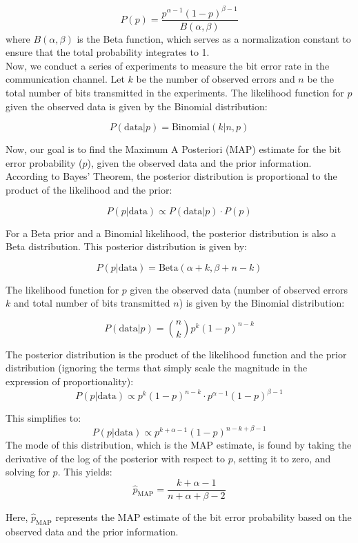 \documentclass[12pt]{book}
\theoremstyle{definition}
\begin{document}
\[ P(p) = \frac{p^{\alpha - 1} (1-p)^{\beta - 1}}{B(\alpha, \beta)} \]
where \( B(\alpha, \beta) \) is the Beta function, which serves as a normalization constant to ensure that the total probability integrates to 1.\\


Now, we conduct a series of experiments to measure the bit error rate in the communication channel. Let \(k\) be the number of observed errors and \(n\) be the total number of bits transmitted in the experiments. The likelihood function for \(p\) given the observed data is given by the Binomial distribution:

\[ P(\text{data} | p) = \text{Binomial}(k | n, p) \]

Now, our goal is to find the Maximum A Posteriori (MAP) estimate for the bit error probability (\(p\)), given the observed data and the prior information. According to Bayes' Theorem, the posterior distribution is proportional to the product of the likelihood and the prior:

\[ P(p | \text{data}) \propto P(\text{data} | p) \cdot P(p) \]

For a Beta prior and a Binomial likelihood, the posterior distribution is also a Beta distribution. This posterior distribution is given by:

\[ P(p | \text{data}) = \text{Beta}(\alpha + k, \beta + n - k) \]

The likelihood function for \( p \) given the observed data (number of observed errors \( k \) and total number of bits transmitted \( n \)) is given by the Binomial distribution:

\[ P(\text{data} | p) = \binom{n}{k} p^k (1-p)^{n-k} \]


The posterior distribution is the product of the likelihood function and the prior distribution (ignoring the terms that simply scale the magnitude in the expression of proportionality):
\[ P(p | \text{data}) \propto p^k (1-p)^{n-k} \cdot p^{\alpha - 1} (1-p)^{\beta - 1} \]

This simplifies to:
\[ P(p | \text{data}) \propto p^{k + \alpha - 1} (1-p)^{n - k + \beta - 1} \]
The mode of this distribution, which is the MAP estimate, is found by taking the derivative of the log of the posterior with respect to \( p \), setting it to zero, and solving for \( p \). This yields:
\[ \hat{p}_\text{MAP} = \frac{k + \alpha - 1}{n + \alpha + \beta - 2} \]




Here, \(\hat{p}_{\text{MAP}}\) represents the MAP estimate of the bit error probability based on the observed data and the prior information.\\
\end{document}
